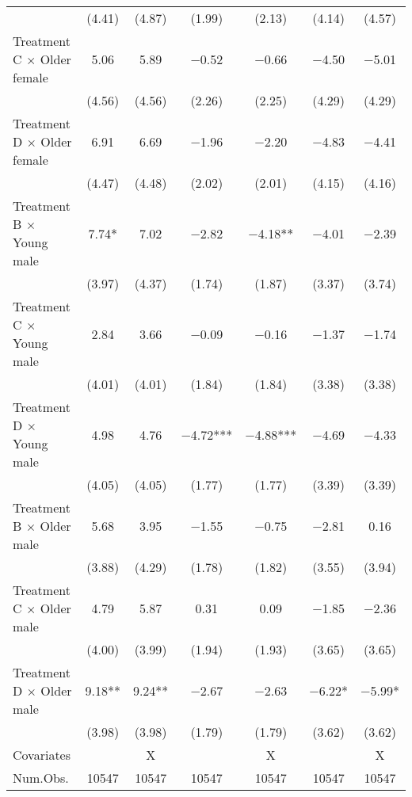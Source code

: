 \documentclass[12pt, a4paper]{article}
\begin{document}
\begin{table}
\begin{threeparttable}
\begin{tabular}[t]{lcccccc}
 & (\num{4.41}) & (\num{4.87}) & (\num{1.99}) & (\num{2.13}) & (\num{4.14}) & (\num{4.57})\\
Treatment C $\times$ Older female & \num{5.06} & \num{5.89} & \num{-0.52} & \num{-0.66} & \num{-4.50} & \num{-5.01}\\
 & (\num{4.56}) & (\num{4.56}) & (\num{2.26}) & (\num{2.25}) & (\num{4.29}) & (\num{4.29})\\
Treatment D $\times$ Older female & \num{6.91} & \num{6.69} & \num{-1.96} & \num{-2.20} & \num{-4.83} & \num{-4.41}\\
 & (\num{4.47}) & (\num{4.48}) & (\num{2.02}) & (\num{2.01}) & (\num{4.15}) & (\num{4.16})\\
Treatment B $\times$ Young male & \num{7.74}* & \num{7.02} & \num{-2.82} & \num{-4.18}** & \num{-4.01} & \num{-2.39}\\
 & (\num{3.97}) & (\num{4.37}) & (\num{1.74}) & (\num{1.87}) & (\num{3.37}) & (\num{3.74})\\
Treatment C $\times$ Young male & \num{2.84} & \num{3.66} & \num{-0.09} & \num{-0.16} & \num{-1.37} & \num{-1.74}\\
 & (\num{4.01}) & (\num{4.01}) & (\num{1.84}) & (\num{1.84}) & (\num{3.38}) & (\num{3.38})\\
Treatment D $\times$ Young male & \num{4.98} & \num{4.76} & \num{-4.72}*** & \num{-4.88}*** & \num{-4.69} & \num{-4.33}\\
 & (\num{4.05}) & (\num{4.05}) & (\num{1.77}) & (\num{1.77}) & (\num{3.39}) & (\num{3.39})\\
Treatment B $\times$ Older male & \num{5.68} & \num{3.95} & \num{-1.55} & \num{-0.75} & \num{-2.81} & \num{0.16}\\
 & (\num{3.88}) & (\num{4.29}) & (\num{1.78}) & (\num{1.82}) & (\num{3.55}) & (\num{3.94})\\
Treatment C $\times$ Older male & \num{4.79} & \num{5.87} & \num{0.31} & \num{0.09} & \num{-1.85} & \num{-2.36}\\
 & (\num{4.00}) & (\num{3.99}) & (\num{1.94}) & (\num{1.93}) & (\num{3.65}) & (\num{3.65})\\
Treatment D $\times$ Older male & \num{9.18}** & \num{9.24}** & \num{-2.67} & \num{-2.63} & \num{-6.22}* & \num{-5.99}*\\
 & (\num{3.98}) & (\num{3.98}) & (\num{1.79}) & (\num{1.79}) & (\num{3.62}) & (\num{3.62})\\
\midrule
Covariates &  & X &  & X &  & X\\
Num.Obs. & \num{10547} & \num{10547} & \num{10547} & \num{10547} & \num{10547} & \num{10547}\\

\end{tabular}
\end{threeparttable}
\end{table}
\end{document}
